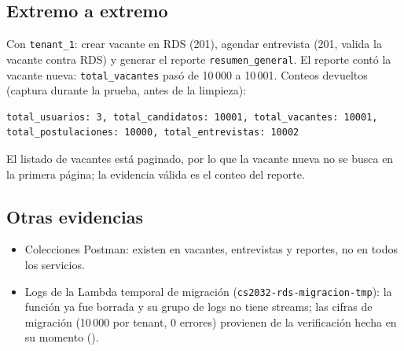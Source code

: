 \subsection{Extremo a extremo}
Con \texttt{tenant\_1}: crear vacante en RDS (201), agendar entrevista (201, valida la vacante contra RDS) y generar el reporte \texttt{resumen\_general}. El reporte contó la vacante nueva: \texttt{total\_vacantes} pasó de 10\,000 a 10\,001. Conteos devueltos (captura durante la prueba, antes de la limpieza):
\begin{lstlisting}
total_usuarios: 3, total_candidatos: 10001, total_vacantes: 10001,
total_postulaciones: 10000, total_entrevistas: 10002
\end{lstlisting}
El listado de vacantes está paginado, por lo que la vacante nueva no se busca en la primera página; la evidencia válida es el conteo del reporte.

\subsection{Otras evidencias}
\begin{itemize}
\item Colecciones Postman: existen en vacantes, entrevistas y reportes, no en todos los servicios.
\item Logs de la Lambda temporal de migración (\texttt{cs2032-rds-migracion-tmp}): la función ya fue borrada y su grupo de logs no tiene streams; las cifras de migración (10\,000 por tenant, 0 errores) provienen de la verificación hecha en su momento ().
\end{itemize}
